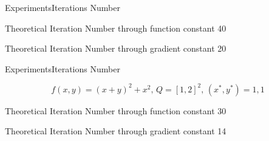 \documentclass{beamer}
\begin{document}
\begin{frame}{Experiments}{Iterations Number}


Theoretical Iteration Number through function constant 40

Theoretical Iteration Number through gradient constant 20
\pause
\begin{figure}[h!]
\label{fig:image}
\end{figure}
\end{frame}

\begin{frame}{Experiments}{Iterations Number}

$$f(x,y) = (x+y)^2+x^2,\,Q = [1,2]^2,\,(x^*, y^*) = 1,1$$

Theoretical Iteration Number through function constant 30

Theoretical Iteration Number through gradient constant 14

\pause

\begin{figure}[h!]
\label{fig:image}
\end{figure}
\end{frame}
\end{document}
